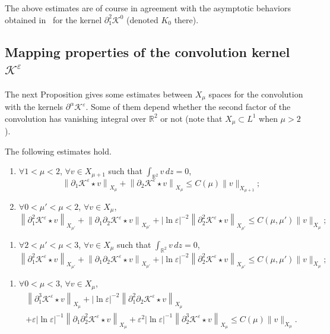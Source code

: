 \documentclass[AHL,Unicode,longabstracts,published]{cedram}
\newcommand*\p{\partial}
\newcommand*\R{\mathbb R}
\newcommand*\BK{\mathcal{K}}
\newcommand*\ls{\leqslant }
\newcommand*\e{\varepsilon}
\newcommand*{\relabel}{\renewcommand{\labelenumi}{(\theenumi)}}
\newcommand*{\romanenumi}{\renewcommand*{\theenumi}{\roman{enumi}}}
\newcommand*{\romenumi}{\renewcommand*{\theenumi}{\roman{enumi}'}\relabel}
\let\oldforall\forall
\renewcommand*{\forall}{\mathrel{\oldforall}}
\begin{document}
\begin{rema}
The above estimates are of course in agreement with the asymptotic behaviors obtained in~\cite{Gravos} for the kernel $ \p_1^2 \BK^0 $ (denoted $ K_0 $ there).
\end{rema}



\subsection{Mapping properties of the convolution kernel \texorpdfstring{$ \BK^\e $}{BK e }}

The next Proposition gives some estimates between $ X_\mu $ spaces for the convolution with the kernels $ \p^\alpha \BK^\e $. Some of them depend whether the second factor of the convolution has vanishing integral over $ \R^2 $ or not (note that $ X_\mu \subset L^1 $ when $ \mu > 2 $).

\begin{prop}\label{mapp}
The following estimates hold.
\begin{enumerate}\romanenumi
\item\label{prop2.6.1} $ \forall 1 < \mu < 2 $, $ \forall v \in X_{\mu +1 } $ such that $ \int_{\R^2} v \, dz = 0 $,
\[
\left\| \p_1 \BK^\e \star v \right\|_{ X_\mu} + \left\| \p_2 \BK^\e \star v \right\|_{X_\mu}
\ls C(\mu) \| v \|_{X_{\mu+1 }} ;
\]
\item\label{prop2.6.2} $ \forall 0 < \mu' <\mu < 2 $, $\forall v \in X_{\mu } $,
\[
\left\| \p_1^2 \BK^\e \star v \right\|_{ X_{\mu'}} + \left\| \p_1 \p_2 \BK^\e \star v \right\|_{X_{\mu'}} + \lvert \ln \e\rvert^{-2} \left\| \p_2^2 \BK^\e \star v \right\|_{X_{\mu'}}
\ls C(\mu, \mu') \| v \|_{X_{\mu} } ;
\]
\end{enumerate}
\begin{enumerate}\romenumi
\setcounter{enumi}{1}
\item\label{prop2.6.2'} $ \forall 2 < \mu' < \mu < 3 $, $ \forall v \in X_{\mu } $ such that $ \int_{\R^2} v \, dz = 0 $,
\[
\left\| \p_1^2 \BK^\e \star v \right\|_{ X_{\mu'}} + \left\| \p_1 \p_2 \BK^\e \star v \right\|_{X_{\mu'}} + \lvert \ln \e\rvert^{-2} \left\| \p_2^2 \BK^\e \star v \right\|_{X_{\mu'}}
\ls C(\mu, \mu') \| v \|_{X_{\mu} } ;
\]
\end{enumerate}
\begin{enumerate}\romanenumi
\setcounter{enumi}{2}
\item\label{prop2.6.3} $ \forall 0 < \mu < 3 $, $ \forall v \in X_{\mu } $,
\begin{multline*}
 \left\|
\p_1^3 \BK^\e \star v \right\|_{ X_{\mu}} + \lvert \ln \e\rvert^{-2} \left\| \p_1^2 \p_2 \BK^\e \star v \right\|_{X_{\mu}}
\\
+ \e \lvert \ln \e\rvert^{-1} \left\| \p_1 \p_2^2 \BK^\e \star v \right\|_{X_{\mu}} + \e^2 \lvert \ln \e\rvert^{-1} \left\| \p_2^3 \BK^\e \star v \right\|_{X_{\mu}}
\ls C(\mu) \| v \|_{ X_{\mu} }.
\end{multline*}
\end{enumerate}
\end{prop}
\end{document}
